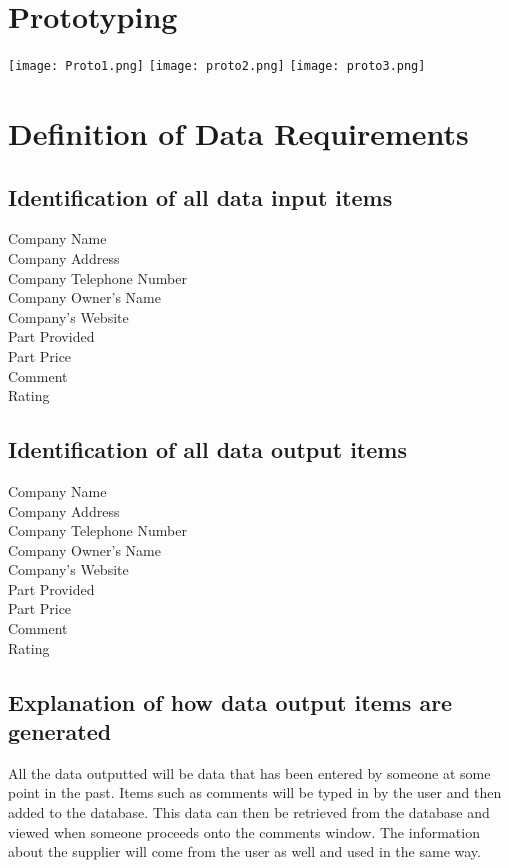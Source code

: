 \section{Prototyping}

\begin{center}
\texttt{[image: Proto1.png]}
\texttt{[image: proto2.png]}
\texttt{[image: proto3.png]}
\end{center}

\section{Definition of Data Requirements}


\subsection{Identification of all data input items}
Company Name\\
Company Address\\
Company Telephone Number\\
Company Owner's Name\\
Company's Website\\
Part Provided\\
Part Price\\
Comment\\
Rating
\subsection{Identification of all data output items}
Company Name\\
Company Address\\
Company Telephone Number\\
Company Owner's Name\\
Company's Website\\
Part Provided\\
Part Price\\
Comment\\
Rating
\subsection{Explanation of how data output items are generated}
All the data outputted will be data that has been entered by someone at some point in the past. Items such as comments will be typed in by the user and then added to the database. This data can then be retrieved from the database and viewed when someone proceeds onto the comments window. The information about the supplier will come from the user as well and used in the same way.

